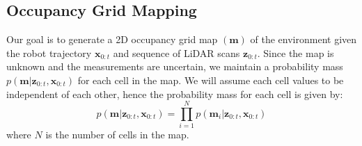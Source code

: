 \documentclass[a4paper]{article}
\begin{document}
\subsection{Occupancy Grid Mapping}
Our goal is to generate a 2D occupancy grid map $(\mathbf{m})$ of the environment given the robot trajectory $\mathbf{x}_{0:t}$ and sequence of LiDAR scans $\mathbf{z}_{0:t}$. Since the map is unknown and the measurements are uncertain, we maintain a probability mass $p(\mathbf{m}| \mathbf{z}_{0:t}, \mathbf{x}_{0:t})$ for each cell in the map. We will assume each cell values to be independent of each other, hence the probability mass for each cell is given by:
\begin{equation}
p(\mathbf{m}| \mathbf{z}_{0:t}, \mathbf{x}_{0:t}) = \prod_{i=1}^{N} p(\mathbf{m}_i| \mathbf{z}_{0:t}, \mathbf{x}_{0:t})
\end{equation}
where $N$ is the number of cells in the map.
\end{document}
